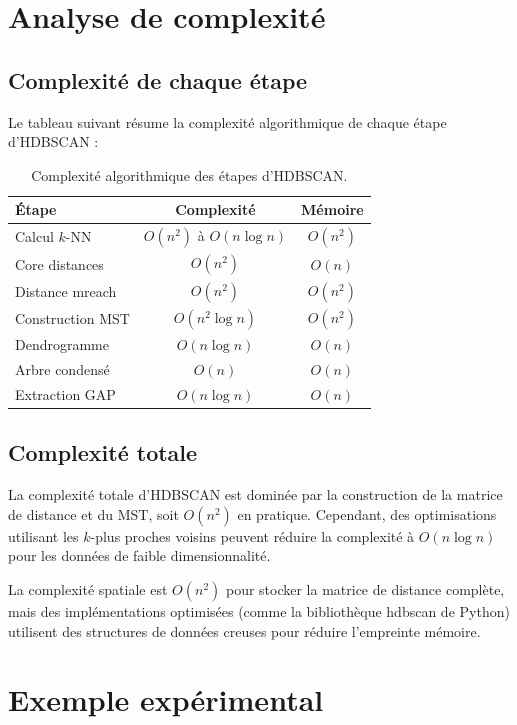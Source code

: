 \documentclass[11pt,a4paper]{article}
\begin{document}
\section{Analyse de complexité}

\subsection{Complexité de chaque étape}

Le tableau suivant résume la complexité algorithmique de chaque étape d'HDBSCAN :

\begin{table}[htbp]
\centering
\begin{tabular}{lcc}
\toprule
\textbf{Étape} & \textbf{Complexité} & \textbf{Mémoire} \\
\midrule
Calcul $k$-NN & $O(n^2)$ à $O(n \log n)$ & $O(n^2)$ \\
Core distances & $O(n^2)$ & $O(n)$ \\
Distance mreach & $O(n^2)$ & $O(n^2)$ \\
Construction MST & $O(n^2 \log n)$ & $O(n^2)$ \\
Dendrogramme & $O(n \log n)$ & $O(n)$ \\
Arbre condensé & $O(n)$ & $O(n)$ \\
Extraction GAP & $O(n \log n)$ & $O(n)$ \\
\bottomrule
\end{tabular}
\caption{Complexité algorithmique des étapes d'HDBSCAN.}
\label{tab:complexity}
\end{table}

\subsection{Complexité totale}

La complexité totale d'HDBSCAN est dominée par la construction de la matrice de distance et du MST, soit $O(n^2)$ en pratique. Cependant, des optimisations utilisant les $k$-plus proches voisins peuvent réduire la complexité à $O(n \log n)$ pour les données de faible dimensionnalité.

La complexité spatiale est $O(n^2)$ pour stocker la matrice de distance complète, mais des implémentations optimisées (comme la bibliothèque hdbscan de Python) utilisent des structures de données creuses pour réduire l'empreinte mémoire.

\section{Exemple expérimental}
\end{document}
